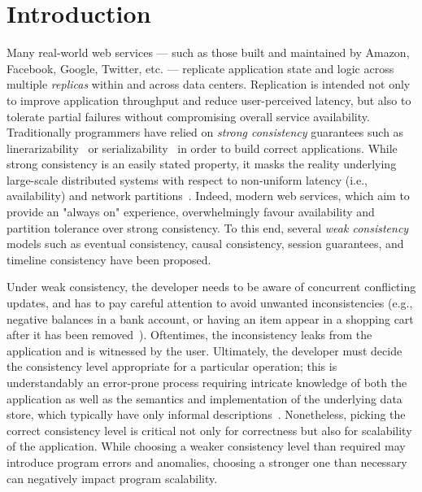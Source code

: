 \section{Introduction}

Many real-world web services --- such as those built and maintained by
Amazon, Facebook, Google, Twitter, etc. --- replicate application state and
logic across multiple \emph{replicas} within and across data
centers. Replication is intended not only to improve application throughput
and reduce user-perceived latency, but also to tolerate partial failures
without compromising overall service availability. Traditionally programmers
have relied on \emph{strong consistency} guarantees such as
linerarizability~\cite{Herlihy1990} or
serializability~\cite{Serializability} in order to build correct
applications.  While strong consistency is an easily stated property, it
masks the reality underlying large-scale distributed systems with respect to
non-uniform latency (i.e., availability) and network
partitions~\cite{Brewer2000,Gilbert}. Indeed, modern web services, which aim
to provide an "always on" experience, overwhelmingly favour availability and
partition tolerance over strong consistency. To this end, several \emph{weak
  consistency} models such as eventual consistency, causal consistency,
session guarantees, and timeline consistency have been proposed.

Under weak consistency, the developer needs to be aware of concurrent
conflicting updates, and has to pay careful attention to avoid unwanted
inconsistencies (e.g., negative balances in a bank account, or having an
item appear in a shopping cart after it has been
removed~\cite{Dynamo}). Oftentimes, the inconsistency leaks from the
application and is witnessed by the user.  Ultimately, the developer must
decide the consistency level appropriate for a particular operation; this is
understandably an error-prone process requiring intricate knowledge of both
the application as well as the semantics and implementation of the
underlying data store, which typically have only informal
descriptions~\cite{}.  Nonetheless, picking the correct consistency level is
critical not only for correctness but also for scalability of the
application. While choosing a weaker consistency level than required may
introduce program errors and anomalies, choosing a stronger one than
necessary can negatively impact program scalability.



